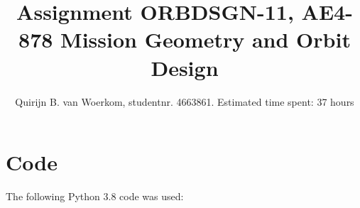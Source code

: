 \documentclass[]{report}
\title{Assignment ORBDSGN-11, AE4-878 Mission Geometry and Orbit Design}
\author{Quirijn B. van Woerkom, studentnr. 4663861. Estimated time spent: 37 hours \newline}
\begin{document}
\maketitle

\printbibliography

\section*{Code}
The following Python 3.8 code was used: 



\end{document}
